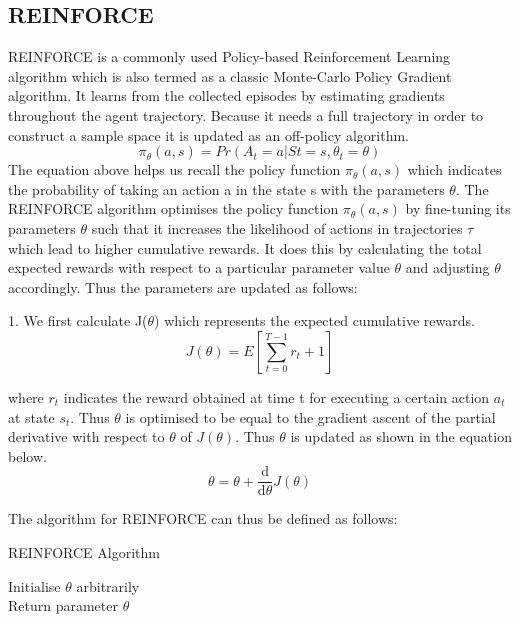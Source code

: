 \documentclass{article}
\begin{document}
\subsection{REINFORCE}
\quad REINFORCE is a commonly used Policy-based Reinforcement Learning algorithm which is also termed as a classic Monte-Carlo Policy Gradient algorithm. It learns from the collected episodes by estimating gradients throughout the agent trajectory. Because it needs a full trajectory in order to construct a sample space it is updated as an off-policy algorithm. \newline
\begin{equation}
\pi_\theta(a, s) = Pr(A_t = a | St = s, \theta_t = \theta)
\end{equation}
The equation above helps us recall the policy function $\pi_{\theta}(a, s)$ which indicates the probability of taking an action a in the state s with the parameters $\theta$. \newline
The REINFORCE algorithm optimises the policy function $\pi_{\theta}(a,s)$ by fine-tuning its parameters $\theta$ such that it increases the likelihood of actions in trajectories $\tau$ which lead to higher cumulative rewards. It does this by calculating the total expected rewards with respect to a particular parameter value $\theta$ and adjusting $\theta$ accordingly. Thus the parameters are updated as follows: \newline

1. We first calculate J($\theta$) which represents the expected cumulative rewards. 
\begin{equation}
J(\theta) = E[ \sum_{t=0}^{T-1}r_t + 1] 
\end{equation}

where $r_{t}$ indicates the reward obtained at time t for executing a certain action $a_t$ at state $s_t$.
Thus $\theta$ is optimised to be equal to the gradient ascent of the partial derivative with respect to $\theta$ of $J(\theta)$. Thus $\theta$ is updated as shown in the equation below. 
\begin{equation}
\theta = \theta + \frac{\mathrm{d}  }{\mathrm{d} \theta} J(\theta)
\end{equation}

The algorithm for REINFORCE can thus be defined as follows: 
\begin{algorithm}[htbp]
\caption{REINFORCE Algorithm}
\SetAlgoLined
\DontPrintSemicolon
\small %
Initialise $\theta$ arbitrarily\;\\
 Return parameter $\theta$\;
\end{algorithm}
\end{document}
